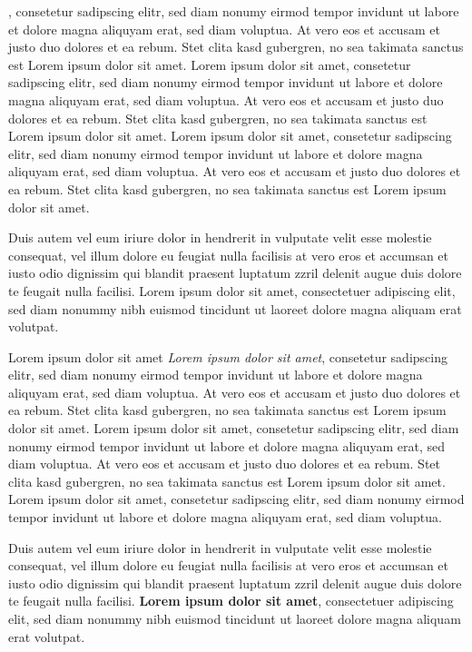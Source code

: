 \documentclass[10pt,twoside,twocolumn,openany,nodeprecatedcode]{dndbook}
\begin{document}
, consetetur sadipscing elitr, sed diam nonumy eirmod tempor invidunt ut labore et dolore magna aliquyam erat, sed diam voluptua. At vero eos et accusam et justo duo dolores et ea rebum. Stet clita kasd gubergren, no sea takimata sanctus est Lorem ipsum dolor sit amet. Lorem ipsum dolor sit amet, consetetur sadipscing elitr, sed diam nonumy eirmod tempor invidunt ut labore et dolore magna aliquyam erat, sed diam voluptua. At vero eos et accusam et justo duo dolores et ea rebum. Stet clita kasd gubergren, no sea takimata sanctus est Lorem ipsum dolor sit amet. Lorem ipsum dolor sit amet, consetetur sadipscing elitr, sed diam nonumy eirmod tempor invidunt ut labore et dolore magna aliquyam erat, sed diam voluptua. At vero eos et accusam et justo duo dolores et ea rebum. Stet clita kasd gubergren, no sea takimata sanctus est Lorem ipsum dolor sit amet.

Duis autem vel eum iriure dolor in hendrerit in vulputate velit esse molestie consequat, vel illum dolore eu feugiat nulla facilisis at vero eros et accumsan et iusto odio dignissim qui blandit praesent luptatum zzril delenit augue duis dolore te feugait nulla facilisi. Lorem ipsum dolor sit amet, consectetuer adipiscing elit, sed diam nonummy nibh euismod tincidunt ut laoreet dolore magna aliquam erat volutpat.

\begin{DndReadAloud}{Lorem ipsum dolor sit amet}
\textit{Lorem ipsum dolor sit amet}, consetetur sadipscing elitr, sed diam nonumy eirmod tempor invidunt ut labore et dolore magna aliquyam erat, sed diam voluptua. At vero eos et accusam et justo duo dolores et ea rebum. Stet clita kasd gubergren, no sea takimata sanctus est Lorem ipsum dolor sit amet. Lorem ipsum dolor sit amet, consetetur sadipscing elitr, sed diam nonumy eirmod tempor invidunt ut labore et dolore magna aliquyam erat, sed diam voluptua. At vero eos et accusam et justo duo dolores et ea rebum. Stet clita kasd gubergren, no sea takimata sanctus est Lorem ipsum dolor sit amet. Lorem ipsum dolor sit amet, consetetur sadipscing elitr, sed diam nonumy eirmod tempor invidunt ut labore et dolore magna aliquyam erat, sed diam voluptua.

Duis autem vel eum iriure dolor in hendrerit in vulputate velit esse molestie consequat, vel illum dolore eu feugiat nulla facilisis at vero eros et accumsan et iusto odio dignissim qui blandit praesent luptatum zzril delenit augue duis dolore te feugait nulla facilisi. \textbf{Lorem ipsum dolor sit amet}, consectetuer adipiscing elit, sed diam nonummy nibh euismod tincidunt ut laoreet dolore magna aliquam erat volutpat. 

\end{DndReadAloud}
\end{document}
